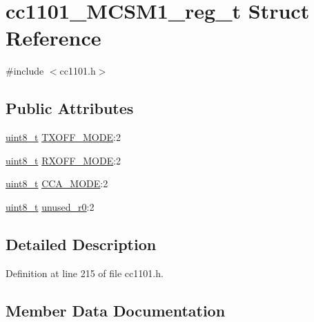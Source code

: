 \hypertarget{structcc1101___m_c_s_m1__reg__t}{}\section{cc1101\+\_\+\+M\+C\+S\+M1\+\_\+reg\+\_\+t Struct Reference}
\label{structcc1101___m_c_s_m1__reg__t}


{\ttfamily \#include $<$cc1101.\+h$>$}

\subsection*{Public Attributes}
\begin{DoxyCompactItemize}
\item 
\hyperlink{_p_e___types_8h_aba7bc1797add20fe3efdf37ced1182c5}{uint8\+\_\+t} \hyperlink{structcc1101___m_c_s_m1__reg__t_ae6bdf94f3b198d94edbe3f3a79a9eea4}{T\+X\+O\+F\+F\+\_\+\+M\+O\+DE}\+:2
\item 
\hyperlink{_p_e___types_8h_aba7bc1797add20fe3efdf37ced1182c5}{uint8\+\_\+t} \hyperlink{structcc1101___m_c_s_m1__reg__t_a87f29bcc288ba0f84cce1ec7576997f0}{R\+X\+O\+F\+F\+\_\+\+M\+O\+DE}\+:2
\item 
\hyperlink{_p_e___types_8h_aba7bc1797add20fe3efdf37ced1182c5}{uint8\+\_\+t} \hyperlink{structcc1101___m_c_s_m1__reg__t_a2a3bb7f745aa4d25ae706bbc52be64c1}{C\+C\+A\+\_\+\+M\+O\+DE}\+:2
\item 
\hyperlink{_p_e___types_8h_aba7bc1797add20fe3efdf37ced1182c5}{uint8\+\_\+t} \hyperlink{structcc1101___m_c_s_m1__reg__t_a6b6a5679210d88dc6414da00ed7b3053}{unused\+\_\+r0}\+:2
\end{DoxyCompactItemize}


\subsection{Detailed Description}


Definition at line 215 of file cc1101.\+h.



\subsection{Member Data Documentation}
